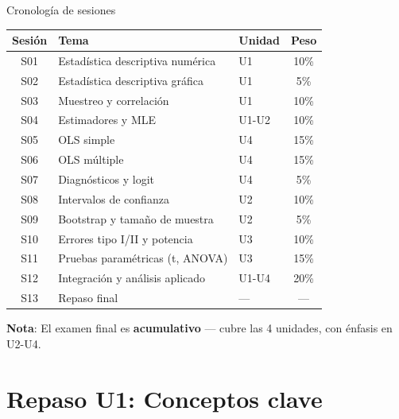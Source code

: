 \documentclass[aspectratio=169, 11pt]{beamer}
\begin{document}
\begin{frame}{Cronología de sesiones}
\scriptsize
\begin{center}
\renewcommand{\arraystretch}{1.05}
\begin{tabular}{cllc}
\toprule
\textbf{Sesión} & \textbf{Tema} & \textbf{Unidad} & \textbf{Peso} \\
\midrule
S01 & Estadística descriptiva numérica & U1 & 10\% \\
S02 & Estadística descriptiva gráfica & U1 & 5\% \\
S03 & Muestreo y correlación & U1 & 10\% \\
S04 & Estimadores y MLE & U1-U2 & 10\% \\
\midrule
S05 & OLS simple & U4 & 15\% \\
S06 & OLS múltiple & U4 & 15\% \\
S07 & Diagnósticos y logit & U4 & 5\% \\
\midrule
S08 & Intervalos de confianza & U2 & 10\% \\
S09 & Bootstrap y tamaño de muestra & U2 & 5\% \\
\midrule
S10 & Errores tipo I/II y potencia & U3 & 10\% \\
S11 & Pruebas paramétricas (t, ANOVA) & U3 & 15\% \\
S12 & Integración y análisis aplicado & U1-U4 & 20\% \\
\midrule
S13 & Repaso final & — & — \\
\bottomrule
\end{tabular}
\end{center}
\small
\textbf{Nota}: El examen final es \textbf{acumulativo} — cubre las 4 unidades, con énfasis en U2-U4.
\end{frame}

\section{Repaso U1: Conceptos clave}
\end{document}
